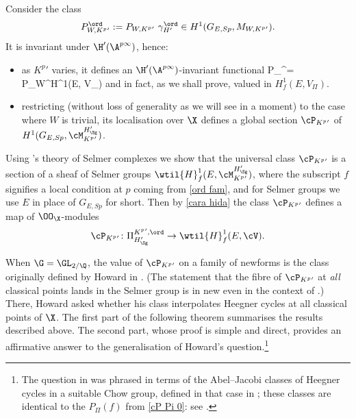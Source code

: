 Consider
 the class
$$P^{\ord}_{W, K^{p}{}'} := P_{W,K^{p}{}'} \ \gamma_{H'}^{\ord}
\in  H^{1}(G_{E, Sp},   M_{W, K^{p}{}'}).$$
It is   invariant under $\H'(\A^{p\infty})$, hence:
\begin{itemize}
\item as $K^{p}{}'$ varies, it defines an $\H'(\A^{p\infty})$-invariant functional
\beq {}
P_{\Pi}^{\ord}= P_{W}\circ \tord\colon \Pi^{\ord}\to H^{1}(E, V_{\Pi})
\eeq
and in fact, as we shall prove, valued in $H^{1}_{f}(E, V_{\Pi})$.
\item
restricting  (without loss of generality as we will see in a moment) to the case where $W$ is trivial,  its localisation over
$\X$ defines a global section $\cP_{K^{p}{}'}$ of
$  H^{1}(G_{E, Sp},\cM_{K^{p}{}'}^{H_{\Sg}'})$.
\end{itemize}


Using \nek's theory of Selmer complexes  we show that
 the universal class $\cP_{K^{p}{}'}$ is a section of a sheaf of Selmer groups   $\wtil{H}^{1}_{f}({E},\cM_{K^{p}{}'}^{H_{\Sg}'})$, where the subscript $f$ signifies  a local condition at $p$ coming from \eqref{ord fam}, and for Selmer groups we use $E$ in place of $G_{E, Sp}$ for short. Then by \eqref{cara hida} the class $\cP_{K^{p}{}'}$   defines a map of $\OO_{\X}$-modules
$$\cP_{K^{p}{}'}\colon \Pi^{K^{p}{}', \ord}_{H'_{\Sg}} \to \wtil{H}^{1}_{f}({E}, \cV).$$

When $\G=\GL_{2/\Q}$, the value of $\cP_{K^{p}{}'}$ on a family of newforms is the class  originally defined by Howard in \cite{howbig}. (The statement  that  the fibre of $\cP_{K^{p}{}'}$  at \emph{all} classical points lands in the Selmer group is in new even in the context of \cite{howbig}.) There, Howard    asked whether his class  interpolates  Heegner cycles at all classical points of $\X$.
The first part of the  following theorem summarises the results described above. The second part, whose proof is  simple and direct,  provides an affirmative answer to the  generalisation of Howard's question.\footnote{The question in \cite{howbig} was phrased in terms of the Abel--Jacobi classes of  Heegner  cycles  in a suitable Chow group, defined in that case in \cite{nek-heeg}; these  classes are identical to the  $P_{\Pi}(f)$ from  \eqref{cP Pi 0}: see \cite[\S~ I.2]{nek-heeg}.}

